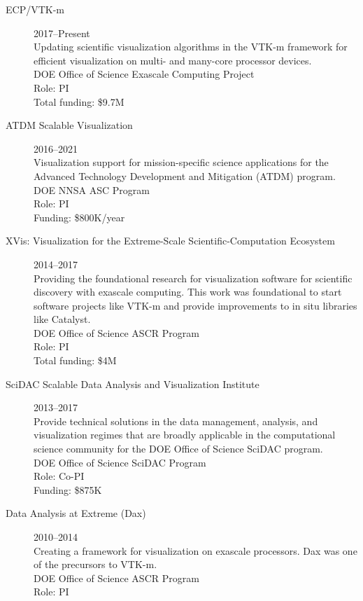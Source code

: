 \documentclass{article}
\begin{document}
\begin{description}
\item[ECP/VTK-m]\hfill 2017--Present\\
  Updating scientific visualization algorithms in the VTK-m framework for efficient visualization on multi- and many-core processor devices.\\
  DOE Office of Science Exascale Computing Project\\
  Role: PI\\
  Total funding: \$9.7M %
\item[ATDM Scalable Visualization]\hfill 2016--2021\\
  Visualization support for mission-specific science applications for the Advanced Technology Development and Mitigation (ATDM) program.\\
  DOE NNSA ASC Program\\
  Role: PI\\
  Funding: \$800K/year
\item[XVis: Visualization for the Extreme-Scale Scientific-Computation Ecosystem]\hfill 2014--2017\\
  Providing the foundational research for visualization software for scientific discovery with exascale computing. This work was foundational to start software projects like \mbox{VTK-m} and provide improvements to in situ libraries like Catalyst. \\
  DOE Office of Science ASCR Program\\
  Role: PI \\
  Total funding: \$4M
\item[SciDAC Scalable Data Analysis and Visualization Institute]\hfill 2013--2017\\
  Provide technical solutions in the data management, analysis, and
  visualization regimes that are broadly applicable in the
  computational science community for the DOE Office of Science SciDAC program.\\
  DOE Office of Science SciDAC Program\\
  Role: Co-PI\\
  Funding: \$875K
\item[Data Analysis at Extreme (Dax)]\hfill 2010--2014\\
  Creating a framework for visualization on exascale processors. Dax was one of the precursors to \mbox{VTK-m}.\\
  DOE Office of Science ASCR Program\\
  Role: PI\\

\end{description}
\end{document}
